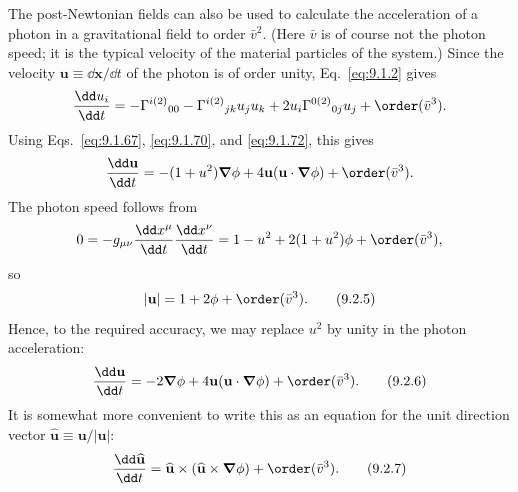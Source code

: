 The post-Newtonian fields can also be used to calculate the acceleration of
a photon in a gravitational field to order \(\bar v^2\). (Here \(\bar v\)
is of course not the photon speed; it is the typical velocity of the
material particles of the system.) Since the velocity
\(\mathbf u\equiv\dd\mathbf x/\dd t\) of the photon is of order unity,
Eq.~\eqref{eq:9.1.2} gives
\[
  \frac{\dd u_i}{\dd t}
  =
  -\Gamma^{i(2)}{}_{00}
  -\Gamma^{i(2)}{}_{jk}u_ju_k
  +2u_i\Gamma^{0(2)}{}_{0j}u_j
  +\order(\bar v^3).
\]
Using Eqs.~\eqref{eq:9.1.67}, \eqref{eq:9.1.70}, and
\eqref{eq:9.1.72}, this gives
\[
  \frac{\dd\mathbf u}{\dd t}
  =
  -(1+u^2)\boldsymbol\nabla\phi
  +4\mathbf u(\mathbf u\cdot\boldsymbol\nabla\phi)
  +\order(\bar v^3).
\]
The photon speed follows from
\[
  0
  =
  -g_{\mu\nu}\frac{\dd x^\mu}{\dd t}\frac{\dd x^\nu}{\dd t}
  =
  1-u^2+2(1+u^2)\phi+\order(\bar v^3),
\]
so
\begin{equation}
  |\mathbf u|=1+2\phi+\order(\bar v^3).
  \tag{9.2.5}\label{eq:9.2.5}
\end{equation}
Hence, to the required accuracy, we may replace \(u^2\) by unity in the
photon acceleration:
\begin{equation}
  \frac{\dd\mathbf u}{\dd t}
  =
  -2\boldsymbol\nabla\phi
  +4\mathbf u(\mathbf u\cdot\boldsymbol\nabla\phi)
  +\order(\bar v^3).
  \tag{9.2.6}\label{eq:9.2.6}
\end{equation}
It is somewhat more convenient to write this as an equation for the unit
direction vector \(\widehat{\mathbf u}\equiv\mathbf u/|\mathbf u|\):
\begin{equation}
  \frac{\dd\widehat{\mathbf u}}{\dd t}
  =
  \widehat{\mathbf u}\times
  (\widehat{\mathbf u}\times\boldsymbol\nabla\phi)
  +\order(\bar v^3).
  \tag{9.2.7}\label{eq:9.2.7}
\end{equation}
